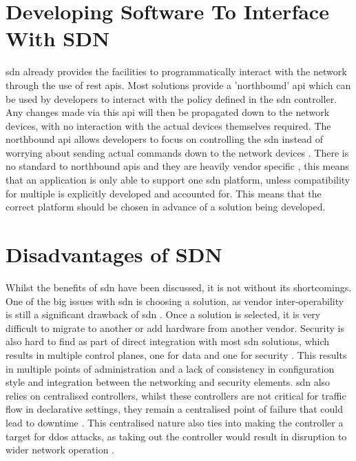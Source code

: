\section{Developing Software To Interface With SDN}
\label{litreview:developing}
\gls{sdn} already provides the facilities to
programmatically interact with the network through the use of \gls{rest}
\gls{api}s. Most solutions provide a 'northbound' \gls{api} which can be used
by developers to interact with the policy defined in the \gls{sdn} controller.
Any changes made via this \gls{api} will then be propagated down to the network
devices, with no interaction with the actual devices themselves required. The
northbound \gls{api} allows developers to focus on controlling the \gls{sdn}
instead of worrying about sending actual commands down to the network devices
\citep{7899569}. There is no standard to northbound \gls{api}s and they are
heavily vendor specific \citep{7502469}, this means that an application is only
able to support one \gls{sdn} platform, unless compatibility for multiple is
explicitly developed and accounted for. This means that the correct platform
should be chosen in advance of a solution being developed.

\section{Disadvantages of SDN}
\label{litreview:disadvantages}
Whilst the benefits of \gls{sdn} have been discussed, it is not without its shortcomings. One of the big issues with \gls{sdn} is choosing a solution, as vendor inter-operability is still a significant drawback of \gls{sdn} \citep{5}. Once a solution is selected, it is very difficult to migrate to another or add hardware from another vendor. Security is also hard to find as part of direct integration with most \gls{sdn} solutions, which results in multiple control planes, one for data and one for security \citep{5}. This results in multiple points of administration and a lack of consistency in configuration style and integration between the networking and security elements. \gls{sdn} also relies on centralised controllers, whilst these controllers are not critical for traffic flow in declarative settings, they remain a centralised point of failure that could lead to downtime \citep{rana2019software}. This centralised nature also ties into making the controller a target for \gls{ddos} attacks, as taking out the controller would result in disruption to wider network operation \citep{7289347}.

